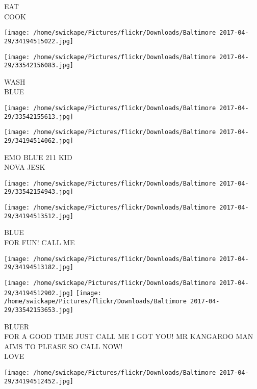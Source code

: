 \documentclass[10pt,letterpaper]{article}
\begin{document}
EAT\\
COOK\\
\pagebreak

\texttt{[image: /home/swickape/Pictures/flickr/Downloads/Baltimore 2017-04-29/34194515022.jpg]}

\vspace{0.25in}
\texttt{[image: /home/swickape/Pictures/flickr/Downloads/Baltimore 2017-04-29/33542156083.jpg]}

WASH\\
BLUE\\
\pagebreak

\texttt{[image: /home/swickape/Pictures/flickr/Downloads/Baltimore 2017-04-29/33542155613.jpg]}

\vspace{0.25in}
\texttt{[image: /home/swickape/Pictures/flickr/Downloads/Baltimore 2017-04-29/34194514062.jpg]}

EMO BLUE 211 KID\\
NOVA JESK\\
\pagebreak

\texttt{[image: /home/swickape/Pictures/flickr/Downloads/Baltimore 2017-04-29/33542154943.jpg]}

\vspace{0.25in}
\texttt{[image: /home/swickape/Pictures/flickr/Downloads/Baltimore 2017-04-29/34194513512.jpg]}

BLUE\\
FOR FUN!  CALL ME\\
\pagebreak

\texttt{[image: /home/swickape/Pictures/flickr/Downloads/Baltimore 2017-04-29/34194513182.jpg]}

\vspace{0.25in}
\texttt{[image: /home/swickape/Pictures/flickr/Downloads/Baltimore 2017-04-29/34194512902.jpg]}
\texttt{[image: /home/swickape/Pictures/flickr/Downloads/Baltimore 2017-04-29/33542153653.jpg]}

BLUER\\
FOR A GOOD TIME JUST CALL ME I GOT YOU!  MR KANGAROO MAN AIMS TO PLEASE SO CALL NOW!\\
LOVE\\
\pagebreak

\texttt{[image: /home/swickape/Pictures/flickr/Downloads/Baltimore 2017-04-29/34194512452.jpg]}
\end{document}

